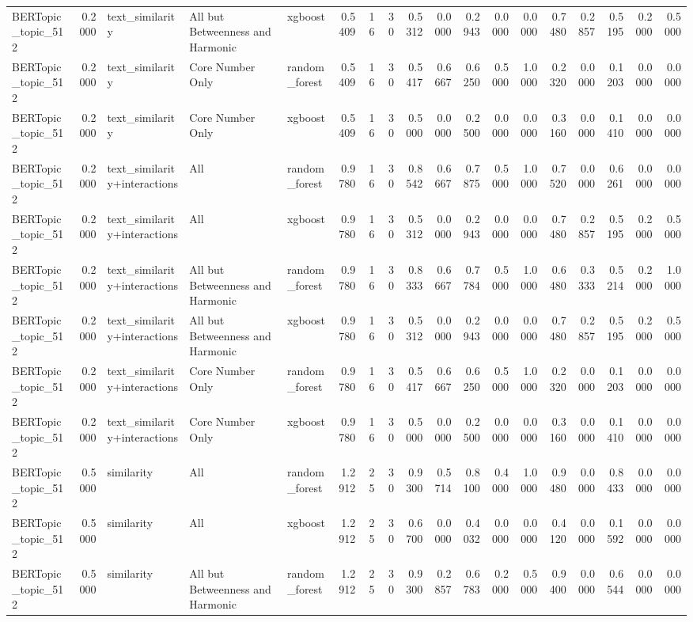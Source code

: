 \begin{tabular}{lrlllrrrrrrrrrrrrr}
BERTopic_topic_512 & 0.2000 & text_similarity & All but Betweenness and Harmonic & xgboost & 0.5409 & 16 & 30 & 0.5312 & 0.0000 & 0.2943 & 0.0000 & 0.0000 & 0.7480 & 0.2857 & 0.5195 & 0.2000 & 0.5000 \\
BERTopic_topic_512 & 0.2000 & text_similarity & Core Number Only & random_forest & 0.5409 & 16 & 30 & 0.5417 & 0.6667 & 0.6250 & 0.5000 & 1.0000 & 0.2320 & 0.0000 & 0.1203 & 0.0000 & 0.0000 \\
BERTopic_topic_512 & 0.2000 & text_similarity & Core Number Only & xgboost & 0.5409 & 16 & 30 & 0.5000 & 0.0000 & 0.2500 & 0.0000 & 0.0000 & 0.3160 & 0.0000 & 0.1410 & 0.0000 & 0.0000 \\
BERTopic_topic_512 & 0.2000 & text_similarity+interactions & All & random_forest & 0.9780 & 16 & 30 & 0.8542 & 0.6667 & 0.7875 & 0.5000 & 1.0000 & 0.7520 & 0.0000 & 0.6261 & 0.0000 & 0.0000 \\
BERTopic_topic_512 & 0.2000 & text_similarity+interactions & All & xgboost & 0.9780 & 16 & 30 & 0.5312 & 0.0000 & 0.2943 & 0.0000 & 0.0000 & 0.7480 & 0.2857 & 0.5195 & 0.2000 & 0.5000 \\
BERTopic_topic_512 & 0.2000 & text_similarity+interactions & All but Betweenness and Harmonic & random_forest & 0.9780 & 16 & 30 & 0.8333 & 0.6667 & 0.7784 & 0.5000 & 1.0000 & 0.6480 & 0.3333 & 0.5214 & 0.2000 & 1.0000 \\
BERTopic_topic_512 & 0.2000 & text_similarity+interactions & All but Betweenness and Harmonic & xgboost & 0.9780 & 16 & 30 & 0.5312 & 0.0000 & 0.2943 & 0.0000 & 0.0000 & 0.7480 & 0.2857 & 0.5195 & 0.2000 & 0.5000 \\
BERTopic_topic_512 & 0.2000 & text_similarity+interactions & Core Number Only & random_forest & 0.9780 & 16 & 30 & 0.5417 & 0.6667 & 0.6250 & 0.5000 & 1.0000 & 0.2320 & 0.0000 & 0.1203 & 0.0000 & 0.0000 \\
BERTopic_topic_512 & 0.2000 & text_similarity+interactions & Core Number Only & xgboost & 0.9780 & 16 & 30 & 0.5000 & 0.0000 & 0.2500 & 0.0000 & 0.0000 & 0.3160 & 0.0000 & 0.1410 & 0.0000 & 0.0000 \\
BERTopic_topic_512 & 0.5000 & similarity & All & random_forest & 1.2912 & 25 & 30 & 0.9300 & 0.5714 & 0.8100 & 0.4000 & 1.0000 & 0.9480 & 0.0000 & 0.8433 & 0.0000 & 0.0000 \\
BERTopic_topic_512 & 0.5000 & similarity & All & xgboost & 1.2912 & 25 & 30 & 0.6700 & 0.0000 & 0.4032 & 0.0000 & 0.0000 & 0.4120 & 0.0000 & 0.1592 & 0.0000 & 0.0000 \\
BERTopic_topic_512 & 0.5000 & similarity & All but Betweenness and Harmonic & random_forest & 1.2912 & 25 & 30 & 0.9300 & 0.2857 & 0.6783 & 0.2000 & 0.5000 & 0.9400 & 0.0000 & 0.6544 & 0.0000 & 0.0000 \\

\end{tabular}
